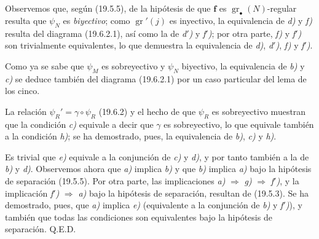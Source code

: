 Observemos que, según (19.5.5), de la hipótesis de que $\mathbf f$ es $\operatorname{gr}_\bullet(N)$-regular resulta que $\psi_N$ es \emph{biyectivo}; como $\operatorname{gr}'(j)$ es inyectivo, la equivalencia de \emph{d)} y \emph{f)} resulta del diagrama (19.6.2.1), así como la de \emph{d$'$)} y \emph{f$'$)}; por otra parte, \emph{f)} y \emph{f$'$)} son trivialmente equivalentes, lo que demuestra la equivalencia de \emph{d)}, \emph{d$'$)}, \emph{f)} y \emph{f$'$)}.

Como ya se sabe que $\psi_M$ es sobreyectivo y $\psi_N$ biyectivo, la equivalencia de \emph{b)} y \emph{c)} se deduce también del diagrama (19.6.2.1) por un caso particular del lema de los cinco.

La relación $\psi_R'=\gamma\circ\psi_R$ (19.6.2) y el hecho de que $\psi_R$ es sobreyectivo muestran que la condición \emph{c)} equivale a decir que $\gamma$ es sobreyectivo, lo que equivale también a la condición \emph{h)}; se ha demostrado, pues, la equivalencia de \emph{b)}, \emph{c)} y \emph{h)}.

Es trivial que \emph{e)} equivale a la conjunción de \emph{c)} y \emph{d)}, y por tanto también a la de \emph{b)} y \emph{d)}. Observemos ahora que \emph{a)} implica \emph{b)} y que \emph{b)} implica \emph{a)} bajo la hipótesis de separación (19.5.5). Por otra parte, las implicaciones \emph{a)} $\Rightarrow$ \emph{g)} $\Rightarrow$ \emph{f$'$)}, y la implicación \emph{f$'$)} $\Rightarrow$ \emph{a)} bajo la hipótesis de separación, resultan de (19.5.3). Se ha demostrado, pues, que \emph{a)} implica \emph{e)} (equivalente a la conjunción de \emph{b)} y \emph{f$'$)}), y también que todas las condiciones son equivalentes bajo la hipótesis de separación. Q.E.D.

